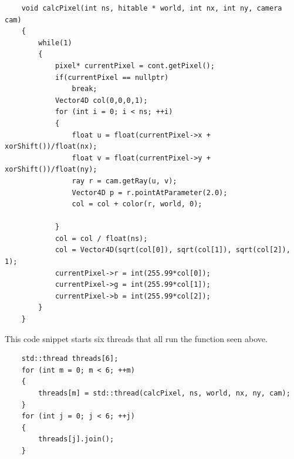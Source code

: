 \documentclass{article}
\begin{document}
    \begin{lstlisting}
    void calcPixel(int ns, hitable * world, int nx, int ny, camera cam)
    {
        while(1)
        {
            pixel* currentPixel = cont.getPixel();
            if(currentPixel == nullptr)
                break;
            Vector4D col(0,0,0,1);
            for (int i = 0; i < ns; ++i)
            {
                float u = float(currentPixel->x + xorShift())/float(nx);
                float v = float(currentPixel->y + xorShift())/float(ny);
                ray r = cam.getRay(u, v);
                Vector4D p = r.pointAtParameter(2.0);
                col = col + color(r, world, 0);
    
            }
            col = col / float(ns);
            col = Vector4D(sqrt(col[0]), sqrt(col[1]), sqrt(col[2]), 1);
            currentPixel->r = int(255.99*col[0]);
            currentPixel->g = int(255.99*col[1]);
            currentPixel->b = int(255.99*col[2]);
        }
    }
    \end{lstlisting}
    This code snippet starts six threads that all run the function seen above.
    \begin{lstlisting}
    std::thread threads[6];
    for (int m = 0; m < 6; ++m)
    {
        threads[m] = std::thread(calcPixel, ns, world, nx, ny, cam);
    }
    for (int j = 0; j < 6; ++j)
    {
        threads[j].join();
    }
    \end{lstlisting}
\end{document}
